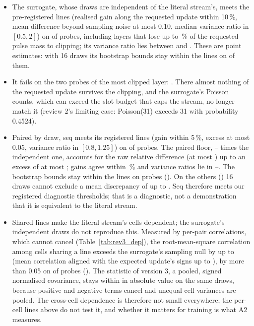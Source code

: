 \begin{itemize}
\item The surrogate, whose draws are independent of the literal stream's, meets the pre-registered lines (realised gain along
      the requested update within 10\,\%, mean difference beyond sampling noise at most 0.10, median variance ratio in
      $[0.5, 2]$) on \RYProbeSurMeetsN{} of \RYProbeN{} probes, including layers that lose up to \RYProbeOkLostMax\,\% of the
      requested pulse mass to clipping; its variance ratio lies between \RYProbeSurVarMin{} and \RYProbeSurVarMax. These are
      point estimates: with 16 draws its bootstrap bounds stay within the lines on \RYProbeSurAtNinetyFiveN{} of them.
\item It fails on the two probes of the most clipped layer: \RYProbeSurFailList. There almost nothing of the requested update
      survives the clipping, and the surrogate's Poisson counts, which can exceed the slot budget that caps the stream, no longer
      match it (review 2's limiting case: Poisson(31) exceeds 31 with probability 0.4524).
\item Paired by draw, seq meets its registered lines (gain within 5\,\%, excess at most 0.05, variance ratio in
      $[0.8, 1.25]$) on \RYProbeSeqMeetsN{} of \RYProbeN{} probes. The paired floor, \RYProbeFloorRatioMin--\RYProbeFloorRatioMax{}
      times the independent one, accounts for the raw relative difference (at most \RYProbeSeqRawMax) up to an excess of at
      most \RYProbeSeqExcessMax; gains agree within \RYProbeSeqGainDevMax\,\% and variance ratios lie in
      \RYProbeSeqVarMin--\RYProbeSeqVarMax. The bootstrap bounds stay within the lines on \RYProbeSeqAtNinetyFiveN{} probes
      (\RYProbeSeqAtNinetyFiveList). On the others (\RYProbeSeqNotNinetyFiveList) 16 draws cannot exclude a mean discrepancy of
      up to \RYProbeSeqExcessPNinetyFiveMax. Seq therefore meets our registered diagnostic thresholds; that is a diagnostic,
      not a demonstration that it is equivalent to the literal stream.
\item Shared lines make the literal stream's cells dependent; the surrogate's independent draws do not reproduce this.
      Measured by per-pair correlations, which cannot cancel (Table~\ref{tab:rev3_dep}), the root-mean-square correlation among
      cells sharing a line exceeds the surrogate's sampling null by up to \RYDepExcessMax{} (mean correlation aligned with the
      expected update's signs up to \RYDepAlignedMax), by more than 0.05 on \RYDepLargeN{} of \RYProbeN{} probes
      (\RYDepLargeList). The statistic of version 3, a pooled, signed normalised covariance, stays within \RYDepVthreePooledMax{}
      in absolute value on the same draws, because positive and negative terms cancel and unequal cell variances are pooled.
      The cross-cell dependence is therefore not small everywhere; the per-cell lines above do not test it, and whether it
      matters for training is what A2 measures.
\end{itemize}
